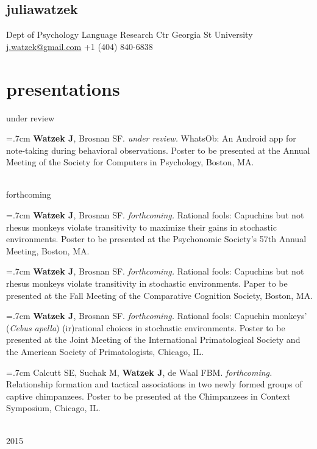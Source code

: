 \documentclass[]{friggeri-cv}
\begin{document}
\begin{aside}
  \section{{\normalfont julia}watzek}
    Dept of Psychology
    Language Research Ctr
    Georgia St University
    ~
    \href{mailto:j.watzek@gmail.com}{j.watzek@gmail.com}
    +1 (404) 840-6838
\end{aside}


\section{presentations}

{\large{} under review}

\hangindent=.7cm \textbf{Watzek J}, Brosnan SF. \emph{under review.} WhatsOb: An Android app for note-taking during behavioral observations. Poster to be presented at the Annual Meeting of the Society for Computers in Psychology, Boston, MA.

{\large{} ~\\[-.15cm] forthcoming}

\hangindent=.7cm \textbf{Watzek J}, Brosnan SF. \emph{forthcoming.} Rational fools: Capuchins but not rhesus monkeys violate transitivity to maximize their gains in stochastic environments. Poster to be presented at the Psychonomic Society's 57th Annual Meeting, Boston, MA.

\hangindent=.7cm \textbf{Watzek J}, Brosnan SF. \emph{forthcoming.} Rational fools: Capuchins but not rhesus monkeys violate transitivity in stochastic environments. Paper to be presented at the Fall Meeting of the Comparative Cognition Society, Boston, MA.

\hangindent=.7cm \textbf{Watzek J}, Brosnan SF. \emph{forthcoming.} Rational fools: Capuchin monkeys' (\emph{Cebus apella}) (ir)rational choices in stochastic environments. Poster to be presented at the Joint Meeting of the International Primatological Society and the American Society of Primatologists, Chicago, IL.

\hangindent=.7cm Calcutt SE, Suchak M, \textbf{Watzek J}, de Waal FBM. \emph{forthcoming.} Relationship formation and tactical associations in two newly formed groups of captive chimpanzees. Poster to be presented at the Chimpanzees in Context Symposium, Chicago, IL.


{\large{} ~\\[-.15cm] 2015}
\end{document}
